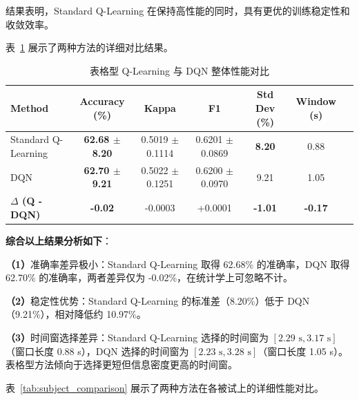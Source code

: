 结果表明，Standard Q-Learning 在保持高性能的同时，具有更优的训练稳定性和收敛效率。

表~\ref{tab:tableq_dqn_comparison} 展示了两种方法的详细对比结果。

\begin{table}[H]
\centering
\caption{表格型 Q-Learning 与 DQN 整体性能对比}
\label{tab:tableq_dqn_comparison}
\small
\begin{tabular}{lcccccc}
\hline
\textbf{Method} & \textbf{Accuracy (\%)} & \textbf{Kappa} & \textbf{F1} & \textbf{Std Dev (\%)} & \textbf{Window (s)} \\
\hline
Standard Q-Learning & \textbf{62.68 $\pm$ 8.20} & 0.5019 $\pm$ 0.1114 & 0.6201 $\pm$ 0.0869 & \textbf{8.20} & 0.88 \\
DQN & \textbf{62.70 $\pm$ 9.21} & 0.5022 $\pm$ 0.1251 & 0.6200 $\pm$ 0.0970 & 9.21 & 1.05 \\
\textbf{$\Delta$ (Q - DQN)} & \textbf{-0.02} & -0.0003 & +0.0001 & \textbf{-1.01} & \textbf{-0.17} \\
\hline
\end{tabular}
\end{table}

\textbf{综合以上结果分析如下}：

\textbf{（1）}准确率差异极小：Standard Q-Learning 取得 62.68\% 的准确率，DQN 取得 62.70\% 的准确率，两者差异仅为 -0.02\%，在统计学上可忽略不计。

\textbf{（2）}稳定性优势：Standard Q-Learning 的标准差（8.20\%）低于 DQN（9.21\%），相对降低约 10.97\%。

\textbf{（3）}时间窗选择差异：Standard Q-Learning 选择的时间窗为 $[2.29\text{ s}, 3.17\text{ s}]$（窗口长度 0.88 s），DQN 选择的时间窗为 $[2.23\text{ s}, 3.28\text{ s}]$（窗口长度 1.05 s）。表格型方法倾向于选择更短但信息密度更高的时间窗。

\label{subsec:subject_level_comparison}

表~\ref{tab:subject_comparison} 展示了两种方法在各被试上的详细性能对比。

